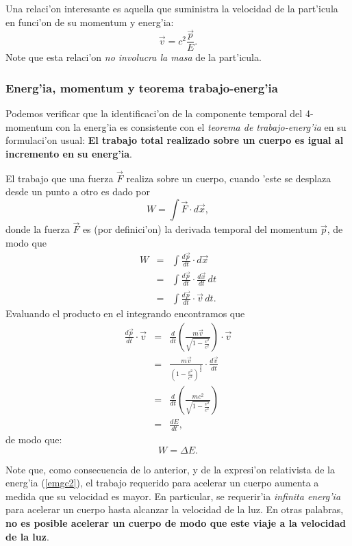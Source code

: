 Una relaci'on interesante es aquella que suministra la velocidad de la
part'icula en funci'on de su momentum y energ'ia:
\begin{equation}
\vec{v}=c^2\frac{\vec{p}}{E}. \label{vpe}
\end{equation}
Note que esta relaci'on \textit{no involucra la masa} de la part'icula.

\subsubsection{Energ'ia, momentum y teorema trabajo-energ'ia}
Podemos verificar que la identificaci'on de la componente temporal del 4-momentum con la energ'ia es consistente con el \textit{teorema de trabajo-energ'ia} en su formulaci'on usual: \textbf{El trabajo total realizado sobre un cuerpo es igual al incremento en su energ'ia}.

El trabajo que una fuerza $\vec{F}$ realiza sobre un cuerpo, cuando 'este se desplaza desde un punto a otro es dado por
\begin{equation}
W=\int\vec{F} \cdot d\vec{x},
\end{equation}
donde la fuerza $\vec{F}$ es (por definici'on) la derivada temporal del momentum $\vec{p}$, de modo
que
\begin{eqnarray}
W&=&\int\frac{d\vec{p}}{dt} \cdot d\vec{x}\\
&=&\int\frac{d\vec{p}}{dt} \cdot \frac{d\vec{x}}{dt}\,dt\\
&=&\int\frac{d\vec{p}}{dt} \cdot \vec{v}\,dt.
\end{eqnarray}
Evaluando el producto en el integrando encontramos que
\begin{eqnarray}
\frac{d\vec{p}}{dt} \cdot
\vec{v}&=&\frac{d}{dt}(\frac{m\vec{v}}{\sqrt{1-\frac{v^2}{c^2}}})\cdot
\vec{v}\\
&=&\frac{m\vec{v}}{(1-\frac{v^2}{c^2})^{\frac{3}{2}}}\cdot
\frac{d\vec{v}}{dt}\\
&=&\frac{d}{dt}(\frac{mc^2}{\sqrt{1-\frac{v^2}{c^2}}}) \\
&=&\frac{dE}{dt},
\end{eqnarray}
de modo que:
\begin{equation}
\boxed{W=\Delta E.}
\end{equation}

Note que, como consecuencia de lo anterior, y de la expresi'on relativista de la energ'ia (\ref{emgc2}), el trabajo requerido para acelerar un cuerpo aumenta a medida que su velocidad es mayor. En particular, se requerir'ia \textit{infinita energ'ia} para acelerar un cuerpo hasta alcanzar la velocidad de la luz. En otras palabras, \textbf{no es posible acelerar un cuerpo de modo que este viaje a la velocidad de la luz}.

